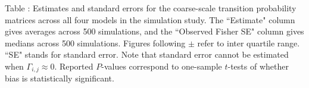 \documentclass{article}
\begin{document}
        \noindent Table : Estimates and standard errors for the coarse-scale transition probability matrices across all four models in the simulation study. The ``Estimate" column gives averages across 500 simulations, and the ``Observed Fisher SE" column gives medians across 500 simulations. Figures following $\pm$ refer to inter quartile range. ``SE" stands for standard error. Note that standard error cannot be estimated when $\Gamma_{i,j} \approx 0$. Reported $P$-values correspond to one-sample $t$-tests of whether bias is statistically significant.
        \addtocounter{tablenum}{1}
        
        \newpage
        
        \begin{center}
\end{center}
\end{document}
